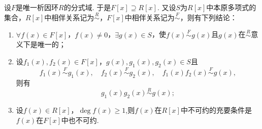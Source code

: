 \documentclass[../../main.tex]{subfiles}%
\begin{document}
\begin{theorem}\label{theorem:抽象代数--定理2.7.2}
设$F$是唯一析因环$R$的分式域. 于是$F[x] \supseteq R[x]$. 又设$S$为$R[x]$中本原多项式的集合，$R[x]$中相伴关系记为$\stackrel{R}{\sim}$，$F[x]$中相伴关系记为$\stackrel{F}{\sim}$，则有下列结论：
\begin{enumerate}[(1)]
\item\label{theorem:抽象代数--定理2.7.2-1} $\forall f(x) \in F[x]$，$f(x) \neq 0$，$\exists g(x) \in S$，使$f(x) \stackrel{F}{\sim} g(x)$且$g(x)$在$\stackrel{R}{\sim}$意义下是唯一的；

\item\label{theorem:抽象代数--定理2.7.2-2} 设$f_1(x), f_2(x) \in F[x]$，$g(x), g_1(x), g_2(x) \in S$且
\[
f_1(x) \stackrel{F}{\sim} g_1(x), \quad f_2(x) \stackrel{F}{\sim} g_2(x), \quad f_1(x)f_2(x) \stackrel{F}{\sim} g(x),
\]
则有
\[
g_1(x)g_2(x) \stackrel{R}{\sim} g(x);
\]

\item\label{theorem:抽象代数--定理2.7.2-3} 设$f(x) \in R[x]$，$\deg f(x) \geqslant 1$,则$f(x)$在$R[x]$中不可约的充要条件是$f(x)$在$F[x]$中也不可约.
\end{enumerate}
\end{theorem}
\end{document}
